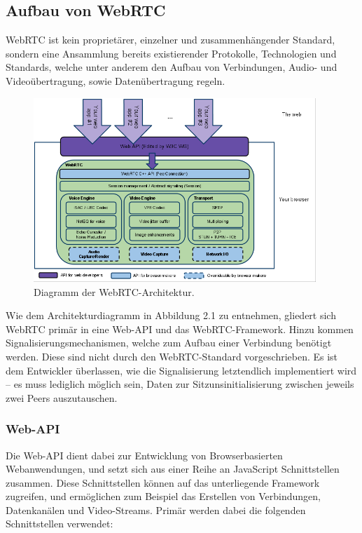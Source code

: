 \subsection{Aufbau von WebRTC}
WebRTC ist kein proprietärer, einzelner und zusammenhängender Standard, sondern eine Ansammlung bereits existierender Protokolle, Technologien und Standards, welche unter anderem den Aufbau von Verbindungen, Audio- und Videoübertragung, sowie Datenübertragung regeln.\par

\begin{figure}[h]
\centering
\includegraphics[width=0.95\textwidth]{bilder/webrtc-diagram.png}
\caption{Diagramm der WebRTC-Architektur.}
\end{figure}

Wie dem Architekturdiagramm in Abbildung 2.1 zu entnehmen, gliedert sich WebRTC primär in eine Web-\acs{API} und das \acs{WebRTC}-Framework. Hinzu kommen Signalisierungsmechanismen, welche zum Aufbau einer Verbindung benötigt werden. Diese sind nicht durch den WebRTC-Standard vorgeschrieben. Es ist dem Entwickler überlassen, wie die Signalisierung letztendlich implementiert wird -- es muss lediglich möglich sein, Daten zur Sitzunsinitialisierung zwischen jeweils zwei Peers auszutauschen.\par

\subsubsection*{Web-API}
Die Web-\acs{API} dient dabei zur Entwicklung von Browserbasierten Webanwendungen, und setzt sich aus einer Reihe an JavaScript Schnittstellen zusammen. Diese Schnittstellen können auf das unterliegende Framework zugreifen, und ermöglichen zum Beispiel das Erstellen von Verbindungen, Datenkanälen und Video-Streams. Primär werden dabei die folgenden Schnittstellen verwendet:

